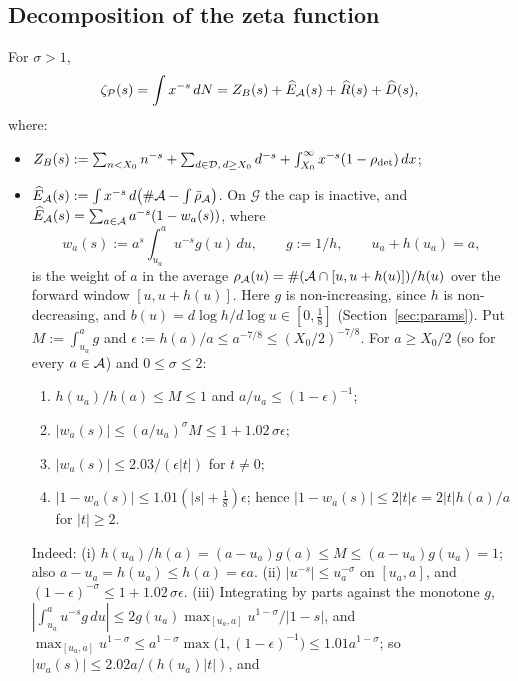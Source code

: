 \subsection{Decomposition of the zeta function}
For $\sigma>1$,
\begin{equation}\label{eq:zetadecomp}
  \zeta_{\mathcal{P}}(s)=\int x^{-s}\,dN=Z_B(s)+\widehat E_{\mathcal{A}}(s)+\widehat R(s)+\widehat D(s),
\end{equation}
where:
\begin{itemize}
\item $Z_B(s):=\sum_{n<X_0}n^{-s}+\sum_{d\in\mathcal D,\,d\ge X_0}d^{-s}+\int_{X_0}^\infty x^{-s}(1-\rho_{\mathrm{det}})\,dx$;
\item $\widehat E_{\mathcal{A}}(s):=\int x^{-s}\,d\bigl(\#\mathcal{A}-\int\bar\rho_{\mathcal{A}}\bigr)$. On $\mathcal G$ the cap is inactive, and
$\widehat E_{\mathcal{A}}(s)=\sum_{a\in\mathcal{A}}a^{-s}(1-w_a(s))$, where
\[
  w_a(s):=a^s\int_{u_a}^au^{-s}g(u)\,du,\qquad g:=1/h,\qquad u_a+h(u_a)=a,
\]
is the weight of $a$ in the average $\rho_{\mathcal{A}}(u)=\#(\mathcal{A}\cap[u,u+h(u)])/h(u)$ over the forward window $[u,u+h(u)]$.
Here $g$ is non-increasing, since $h$ is non-decreasing, and $b(u)=d\log h/d\log u\in[0,\frac18]$ (Section~\ref{sec:params}). Put
$M:=\int_{u_a}^ag$ and $\epsilon:=h(a)/a\le a^{-7/8}\le(X_0/2)^{-7/8}$. For $a\ge X_0/2$ (so for every $a\in\mathcal{A}$) and $0\le\sigma\le2$:
\begin{enumerate}[label=(\roman*)]
\item $h(u_a)/h(a)\le M\le1$ and $a/u_a\le(1-\epsilon)^{-1}$;
\item $|w_a(s)|\le(a/u_a)^{\sigma}M\le1+1.02\,\sigma\epsilon$;
\item $|w_a(s)|\le2.03/(\epsilon|t|)$ for $t\ne0$;
\item $|1-w_a(s)|\le1.01(|s|+\frac18)\epsilon$; hence $|1-w_a(s)|\le2|t|\epsilon=2|t|h(a)/a$ for $|t|\ge2$.
\end{enumerate}
Indeed:
(i) $h(u_a)/h(a)=(a-u_a)g(a)\le M\le(a-u_a)g(u_a)=1$; also $a-u_a=h(u_a)\le h(a)=\epsilon a$.
(ii) $|u^{-s}|\le u_a^{-\sigma}$ on $[u_a,a]$, and $(1-\epsilon)^{-\sigma}\le1+1.02\,\sigma\epsilon$.
(iii) Integrating by parts against the monotone $g$, $|\int_{u_a}^au^{-s}g\,du|\le2g(u_a)\max_{[u_a,a]}u^{1-\sigma}/|1-s|$, and
$\max_{[u_a,a]}u^{1-\sigma}\le a^{1-\sigma}\max\bigl(1,(1-\epsilon)^{-1}\bigr)\le1.01a^{1-\sigma}$; so $|w_a(s)|\le2.02a/(h(u_a)|t|)$, and

\end{itemize}
